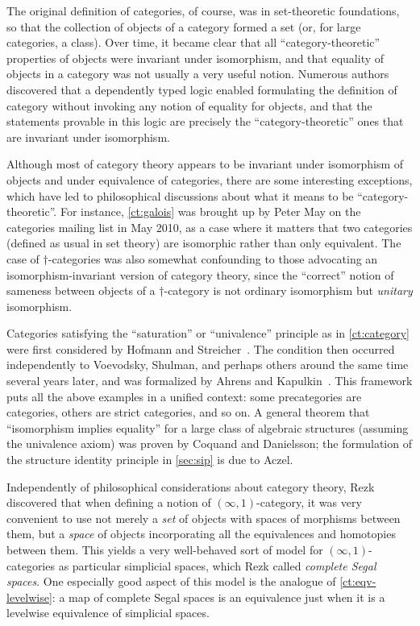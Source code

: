 The original definition of categories, of course, was in set-theoretic foundations, so that the collection of objects of a category formed a set (or, for large categories, a class).
Over time, it became clear that all ``category-theoretic'' properties of objects were invariant under isomorphism, and that equality of objects in a category was not usually a very useful notion.
Numerous authors~\cite{blanc:eqv-log,freyd:invar-eqv,makkai:folds,makkai:comparing} discovered that a dependently typed logic enabled formulating the definition of category without invoking any notion of equality for objects, and that the statements provable in this logic are precisely the ``category-theoretic'' ones that are invariant under isomorphism.
%

Although most of category theory appears to be invariant under isomorphism of objects and under equivalence of categories, there are some interesting exceptions, which have led to philosophical discussions about what it means to be ``category-theoretic''.
For instance, \cref{ct:galois} was brought up by Peter May on the categories mailing list in May 2010, as a case where it matters that two categories (defined as usual in set theory) are isomorphic rather than only equivalent.
The case of $\dagger$-categories was also somewhat confounding to those advocating an isomorphism-invariant version of category theory, since the ``correct'' notion of sameness between objects of a $\dagger$-category is not ordinary isomorphism but \emph{unitary} isomorphism.
%

Categories satisfying the ``saturation'' or ``univalence'' principle as in \cref{ct:category} were first considered by Hofmann and Streicher~\cite{hs:gpd-typethy}.
The condition then occurred independently to Voevodsky, Shulman, and perhaps others around the same time several years later, and was formalized by Ahrens and Kapulkin~\cite{aks:rezk}.
This framework puts all the above examples in a unified context: some precategories are categories, others are strict categories, and so on.
A general theorem that ``isomorphism implies equality'' for a large class of algebraic structures (assuming the univalence axiom) was proven by Coquand and Danielsson; the formulation of the structure identity principle in \cref{sec:sip} is due to Aczel.

Independently of philosophical considerations about category theory, Rezk~\cite{rezk01css} discovered that when defining a notion of $(\infty,1)$-cat\-e\-go\-ry,
%
it was very convenient to use not merely a \emph{set} of objects with spaces of morphisms between them, but a \emph{space} of objects incorporating all the equivalences and homotopies between them.
This yields a very well-behaved sort of model for $(\infty,1)$-categories as particular simplicial spaces, which Rezk called \emph{complete Segal spaces}.
%
%
One especially good aspect of this model is the analogue of \cref{ct:eqv-levelwise}: a map of complete Segal spaces is an equivalence just when it is a levelwise equivalence of simplicial spaces.

